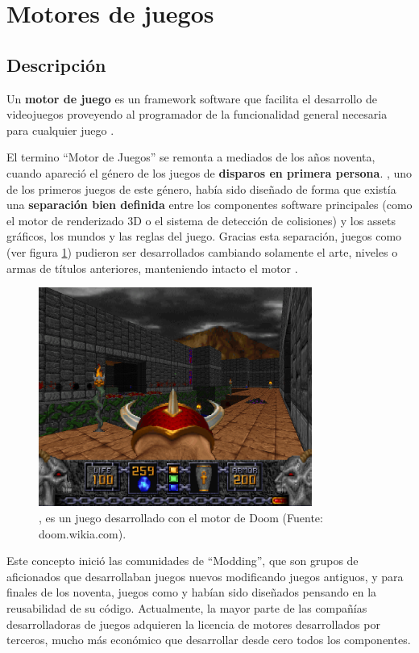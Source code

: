 \section{Motores de juegos}
\subsection{Descripción}
Un \textbf{motor de juego} es un framework software que facilita el desarrollo de videojuegos proveyendo al programador de la funcionalidad general necesaria para cualquier juego \cite{game_engine}.

El termino ``Motor de Juegos'' se remonta a mediados de los años noventa, cuando apareció el género de los juegos de \textbf{disparos en primera persona}. , uno de los primeros juegos de este género, había sido diseñado de forma que existía una \textbf{separación bien definida} entre los componentes software principales (como el motor de renderizado 3D o el sistema de detección de colisiones) y los assets gráficos, los mundos y las reglas del juego. Gracias esta separación, juegos como  (ver figura \ref{heretic}) pudieron ser desarrollados cambiando solamente el arte, niveles o armas de títulos anteriores, manteniendo intacto el motor \cite{game_engine_architecture}. 

\begin{figure}[h]
    \centering
    \includegraphics[width=0.8\textwidth]{images/estadodelarte/motores/heretic}
    \caption{, es un juego desarrollado con el motor de Doom (Fuente: doom.wikia.com).}
    \label{heretic}
\end{figure}

Este concepto inició las comunidades de ``Modding'', que son grupos de aficionados que desarrollaban juegos nuevos modificando juegos antiguos, y para finales de los noventa, juegos como  y  habían sido diseñados pensando en la reusabilidad de su código. Actualmente, la mayor parte de las compañías desarrolladoras de juegos adquieren la licencia de motores desarrollados por terceros, mucho más económico que desarrollar desde cero todos los componentes.

